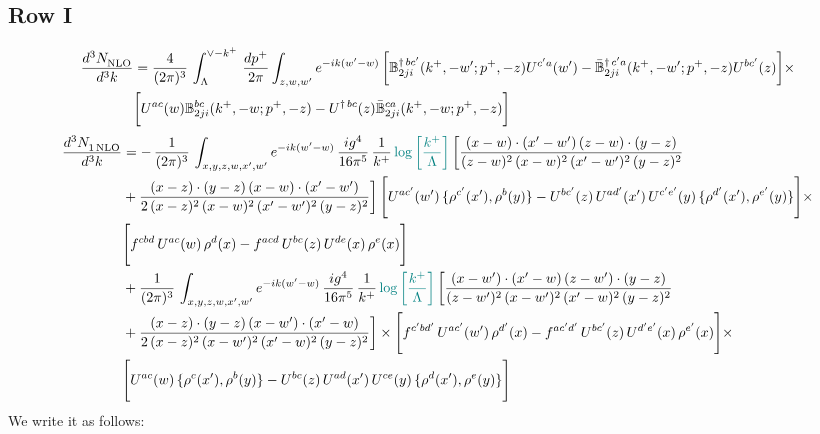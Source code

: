 \documentclass[9pt]{article}
\def\mf#1{\mathbb{#1}}
\numberwithin{equation}{section}
\begin{document}
\subsection{Row I}
\begin{align}
    \frac{d^{3}N_{\rm NLO}^{\rm}}{d^{3}k}  & = \frac{4}{(2\pi)^{3}}\,\int_{\Lambda}^{\vee-k^{+}}\, \frac{dp^{+}}{2\pi}\int_{z,w,w^{\prime}} e^{-ik(w^{\prime}-w)}\, \bigg[\mf{B}^{\dagger\, bc^{\prime}}_{2ji}(k^{+},-w^{\prime};p^{+},-z)U^{ c^{\prime}a}(w^{\prime}) -\Bar{\mf{B}}^{\dagger\, c^{\prime}a}_{2ji}(k^{+},-w^{\prime}; p^{+},-z)U^{bc^{\prime}}(z)\bigg]\times\notag \\ & \bigg[U^{ac}(w) \mf{B}^{bc}_{2ji}(k^{+},-w;p^{+},-z) -U^{\dagger\, bc}(z)\Bar{\mf{B}}^{ca}_{2ji}(k^{+},-w; p^{+},-z)\bigg]\nonumber
\end{align}
\begin{align}
 \frac{d^{3}N_{1\,\rm NLO}^{\rm}}{d^{3}k}  & =   -\, \frac{1}{(2\pi)^{3}}\,\int_{x,y,z,w,x',w^{\prime}} e^{-ik(w^{\prime}-w)}\,\frac{ig^{4}}{16\pi^{5}}\,\frac{1}{k^{+}}\,{\color{teal}\log{\left[\frac{k^{+}}{\Lambda}\right]}}\,\bigg[\frac{(x-w)\cdot (x'-w')\,(z-w)\cdot (y-z)}{(z-w)^{2}\,(x-w)^{2}\,(x'-w')^{2}\,(y-z)^{2}}\notag \\ & +\frac{(x-z)\cdot (y-z)\,(x-w)\cdot (x'-w')}{2\,(x-z)^{2}\, (x-w)^{2}\,(x'-w')^{2}\,(y-z)^{2}}\bigg]\, \Bigg[U^{ac'}(w')\,\{\rho^{c'}(x'),\rho^{b}(y)\}-U^{bc'}(z)\,U^{ad'}(x')\,U^{c'e'}(y)\, \{\rho^{d'}(x'),\rho^{e'}(y)\}\Bigg]\times \notag \\ & \Bigg[f^{cbd}\,U^{ac}(w)\,\rho^{d}(x)-f^{acd}\, U^{bc}(z)\,U^{de}(x)\,\rho^{e}(x)\Bigg]\notag \\ & + \frac{1}{(2\pi)^{3}}\,\int_{x,y,z,w,x',w^{\prime}} e^{-ik(w^{\prime}-w)}\,\frac{ig^{4}}{16\pi^{5}}\,\frac{1}{k^{+}}\,{\color{teal}\log{\left[\frac{k^{+}}{\Lambda}\right]}}\,\bigg[\frac{(x-w')\cdot (x'-w)\,(z-w')\cdot (y-z)}{(z-w')^{2}\,(x-w')^{2}\,(x'-w)^{2}\,(y-z)^{2}}\notag \\ & +\frac{(x-z)\cdot (y-z)\,(x-w')\cdot (x'-w)}{2\,(x-z)^{2}\, (x-w')^{2}\,(x'-w)^{2}\,(y-z)^{2}}\bigg] \times\Bigg[f^{c'bd'}\,U^{ac'}(w')\,\rho^{d'}(x)-f^{ac'd'}\, U^{bc'}(z)\,U^{d'e'}(x)\,\rho^{e'}(x)\Bigg] \times \notag \\ & \Bigg[U^{ac}(w)\,\{\rho^{c}(x'),\rho^{b}(y)\}-U^{bc}(z)\,U^{ad}(x')\,U^{ce}(y)\, \{\rho^{d}(x'),\rho^{e}(y)\}\Bigg]
\end{align}
We write it as follows: 
\end{document}
